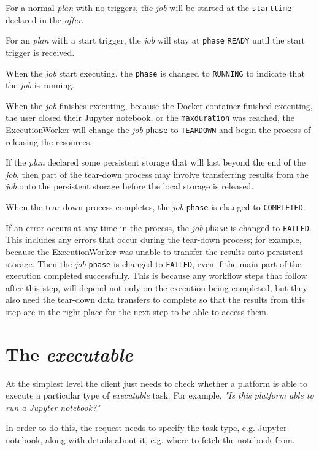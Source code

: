 \documentclass[11pt,a4paper]{ivoa}
\newcommand{\execworkerclass} {ExecutionWorker}
\newcommand{\jupyternotebook} {Jupyter notebook}
\newcommand{\dockercontainer} {Docker container}
\newcommand{\codeword}[1] {\texttt{#1}}
\newcommand{\executable} {\textit{executable}}
\newcommand{\excutabletask} {\textit{executable} task}
\newcommand{\execplan} {\textit{plan}}
\newcommand{\execoffer} {\textit{offer}}
\newcommand{\workerjob} {\textit{job}}
\newcommand{\teardown} {tear-down}
\begin{document}
For a normal \execplan{} with no triggers, the \workerjob{} will be started at
the \codeword{starttime} declared in the \execoffer{}.

For an \execplan{} with a start trigger, the \workerjob{} will stay at \codeword{phase}
\codeword{READY} until the start trigger is received.

When the \workerjob{} start executing, the \codeword{phase} is changed to \codeword{RUNNING}
to indicate that the \workerjob{} is running.

When the \workerjob{} finishes executing, because the \dockercontainer{} finished executing,
the user closed their \jupyternotebook, or the \codeword{maxduration} was reached,
the \execworkerclass{} will change the \workerjob{} \codeword{phase} to \codeword{TEARDOWN} and
begin the process of releasing the resources.

If the \execplan{} declared some persistent storage that will last beyond the end of the \workerjob{},
then part of the \teardown{} process may involve transferring results from the \workerjob{}
onto the persistent storage before the local storage is released.

When the \teardown{} process completes, the \workerjob{} \codeword{phase} is changed to \codeword{COMPLETED}.

If an error occurs at any time in the process, the \workerjob{} \codeword{phase} is changed to \codeword{FAILED}.
This includes any errors that occur during the \teardown{} process; for example, because
the \execworkerclass{} was unable to transfer the results onto persistent storage.
Then the \workerjob{} \codeword{phase} is changed to \codeword{FAILED}, even if the main part of the
execution completed successfully.
This is because any workflow steps that follow after this step, will depend not only on the execution being
completed, but they also need the \teardown{} data transfers to complete so that the results from this step
are in the right place for the next step to be able to access them.

\section{The \executable{}}
\label{executable}

At the simplest level the client just needs to check whether a platform is able to execute a particular
type of \excutabletask{}.
For example, \textit{"Is this platform able to run a \jupyternotebook{}?"}

In order to do this, the request needs to specify the task type, e.g. \jupyternotebook{},
along with details about it, e.g. where to fetch the notebook from.
\end{document}
